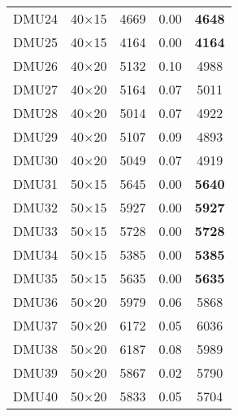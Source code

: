 \begin{table}[H]
\begin{tabular}{@{}ccccc@{}}
DMU24 & 40$\times$15 & 4669 & 0.00 & \textbf{4648}\\ 
DMU25 & 40$\times$15 & 4164 & 0.00 & \textbf{4164}\\ 
DMU26 & 40$\times$20 & 5132 & 0.10 & 4988\\ 
DMU27 & 40$\times$20 & 5164 & 0.07 & 5011\\ 
DMU28 & 40$\times$20 & 5014 & 0.07 & 4922\\ 
DMU29 & 40$\times$20 & 5107 & 0.09 & 4893\\ 
DMU30 & 40$\times$20 & 5049 & 0.07 & 4919\\ 
DMU31 & 50$\times$15 & 5645 & 0.00 & \textbf{5640}\\ 
DMU32 & 50$\times$15 & 5927 & 0.00 & \textbf{5927}\\ 
DMU33 & 50$\times$15 & 5728 & 0.00 & \textbf{5728}\\ 
DMU34 & 50$\times$15 & 5385 & 0.00 & \textbf{5385}\\ 
DMU35 & 50$\times$15 & 5635 & 0.00 & \textbf{5635}\\ 
DMU36 & 50$\times$20 & 5979 & 0.06 & 5868\\ 
DMU37 & 50$\times$20 & 6172 & 0.05 & 6036\\ 
DMU38 & 50$\times$20 & 6187 & 0.08 & 5989\\ 
DMU39 & 50$\times$20 & 5867 & 0.02 & 5790\\ 
DMU40 & 50$\times$20 & 5833 & 0.05 & 5704\\ \bottomrule
\end{tabular}
\end{table}

